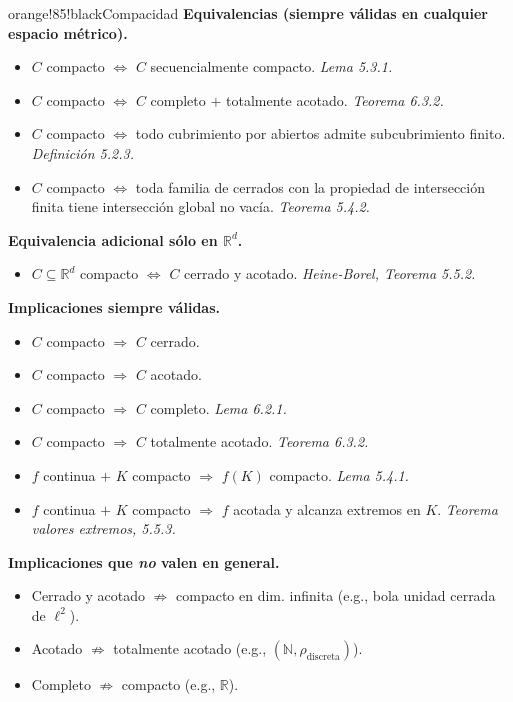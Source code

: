 \documentclass[11pt,twoside]{article}
\newcommand{\R}{\mathbb{R}}
\newcommand{\N}{\mathbb{N}}
\begin{document}
\begin{equivbox}{orange!85!black}{Compacidad}
\textbf{Equivalencias (siempre válidas en cualquier espacio métrico).}
\begin{itemize}[leftmargin=2em,itemsep=2pt]
\item $C$ compacto $\Leftrightarrow$ $C$ secuencialmente compacto. \hfill\textit{Lema 5.3.1.}
\item $C$ compacto $\Leftrightarrow$ $C$ completo $+$ totalmente acotado. \hfill\textit{Teorema 6.3.2.}
\item $C$ compacto $\Leftrightarrow$ todo cubrimiento por abiertos admite subcubrimiento finito. \hfill\textit{Definición 5.2.3.}
\item $C$ compacto $\Leftrightarrow$ toda familia de cerrados con la propiedad de intersección finita tiene intersección global no vacía. \hfill\textit{Teorema 5.4.2.}
\end{itemize}

\textbf{Equivalencia adicional sólo en $\R^{d}$.}
\begin{itemize}[leftmargin=2em,itemsep=2pt]
\item $C \subseteq \R^{d}$ compacto $\Leftrightarrow$ $C$ cerrado y acotado. \hfill\textit{Heine-Borel, Teorema 5.5.2.}
\end{itemize}

\textbf{Implicaciones siempre válidas.}
\begin{itemize}[leftmargin=2em,itemsep=2pt]
\item $C$ compacto $\Rightarrow$ $C$ cerrado.
\item $C$ compacto $\Rightarrow$ $C$ acotado.
\item $C$ compacto $\Rightarrow$ $C$ completo. \hfill\textit{Lema 6.2.1.}
\item $C$ compacto $\Rightarrow$ $C$ totalmente acotado. \hfill\textit{Teorema 6.3.2.}
\item $f$ continua $+$ $K$ compacto $\Rightarrow$ $f(K)$ compacto. \hfill\textit{Lema 5.4.1.}
\item $f$ continua $+$ $K$ compacto $\Rightarrow$ $f$ acotada y alcanza extremos en $K$. \hfill\textit{Teorema valores extremos, 5.5.3.}
\end{itemize}

\textbf{Implicaciones que \emph{no} valen en general.}
\begin{itemize}[leftmargin=2em,itemsep=2pt]
\item Cerrado y acotado $\not\Rightarrow$ compacto en dim. infinita (e.g., bola unidad cerrada de $\ell^{2}$).
\item Acotado $\not\Rightarrow$ totalmente acotado (e.g., $(\N, \rho_{\mathrm{discreta}})$).
\item Completo $\not\Rightarrow$ compacto (e.g., $\R$).
\end{itemize}
\end{equivbox}
\end{document}

